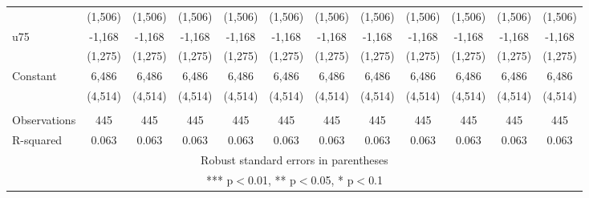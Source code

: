 \documentclass[]{article}
\begin{document}
\begin{tabular}{lccccccccccc}
 & (1,506) & (1,506) & (1,506) & (1,506) & (1,506) & (1,506) & (1,506) & (1,506) & (1,506) & (1,506) & (1,506) \\
u75 & -1,168 & -1,168 & -1,168 & -1,168 & -1,168 & -1,168 & -1,168 & -1,168 & -1,168 & -1,168 & -1,168 \\
 & (1,275) & (1,275) & (1,275) & (1,275) & (1,275) & (1,275) & (1,275) & (1,275) & (1,275) & (1,275) & (1,275) \\
Constant & 6,486 & 6,486 & 6,486 & 6,486 & 6,486 & 6,486 & 6,486 & 6,486 & 6,486 & 6,486 & 6,486 \\
 & (4,514) & (4,514) & (4,514) & (4,514) & (4,514) & (4,514) & (4,514) & (4,514) & (4,514) & (4,514) & (4,514) \\
 &  &  &  &  &  &  &  &  &  &  &  \\
Observations & 445 & 445 & 445 & 445 & 445 & 445 & 445 & 445 & 445 & 445 & 445 \\
 R-squared & 0.063 & 0.063 & 0.063 & 0.063 & 0.063 & 0.063 & 0.063 & 0.063 & 0.063 & 0.063 & 0.063 \\ \hline
\multicolumn{12}{c}{ Robust standard errors in parentheses} \\
\multicolumn{12}{c}{ *** p$<$0.01, ** p$<$0.05, * p$<$0.1} \\
\end{tabular}
\end{document}
